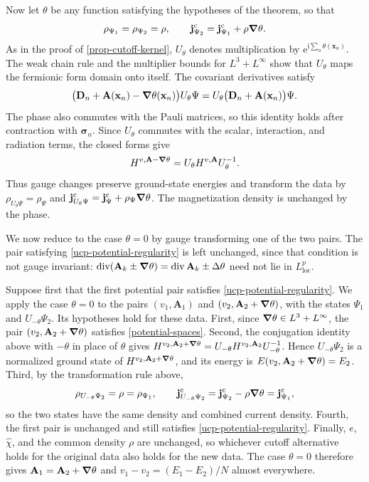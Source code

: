 \documentclass[final,reqno]{amsart}
\DeclareMathOperator{\div}{div}
\theoremstyle{remark}
\renewcommand{\i}{\mathrm{i}}
\newcommand{\e}{\mathrm{e}}
\newcommand{\vjc}{\mathbf{j}^{\mathrm{c}}}
\newcommand{\vsigma}{{\bm{\sigma}}}
\newcommand{\vx}{\mathbf{x}}
\newcommand{\vA}{{\mathbf{A}}}
\newcommand{\vD}{{\mathbf{D}}}
\newcommand{\wh}[1]{\widehat{#1}}
\begin{document}
Now let $\theta$ be any function satisfying the hypotheses of the
theorem, so that
\[
 \rho_{\Psi_1}=\rho_{\Psi_2}=\rho,\qquad
 \vjc_{\Psi_2}=\vjc_{\Psi_1}+\rho\grad\theta.
\]
As in the proof of \cref{prop-cutoff-kernel}, $U_\theta$ denotes
multiplication by $\e^{\i\sum_n\theta(\vx_n)}$.
The weak chain rule and the multiplier bounds for $L^3+L^\infty$
show that $U_\theta$ maps the fermionic form domain onto itself.
The covariant derivatives satisfy
\[
 \bigl(\vD_n+\vA(\vx_n)-\grad\theta(\vx_n)\bigr)U_\theta\Psi
   =U_\theta\bigl(\vD_n+\vA(\vx_n)\bigr)\Psi.
\]
The phase also commutes with the Pauli matrices, so this identity
holds after contraction with $\vsigma_n$.
Since $U_\theta$ commutes with the scalar, interaction, and radiation
terms, the closed forms give
\[
 H^{v,\vA-\grad\theta}
    =U_\theta H^{v,\vA}U_\theta^{-1}.
\]
Thus gauge changes preserve ground-state energies and transform the
data by $\rho_{U_\theta\Psi}=\rho_\Psi$ and
$\vjc_{U_\theta\Psi}=\vjc_\Psi+\rho_\Psi\grad\theta$.
The magnetization density is unchanged by the phase.

We now reduce to the case $\theta=0$ by gauge transforming one of the
two pairs.  The pair satisfying \cref{ucp-potential-regularity} is left
unchanged, since that condition is not gauge invariant:
$\div(\vA_k\pm\grad\theta)=\div\vA_k\pm\Delta\theta$ need not lie in
$L^p_\mathrm{loc}$.

Suppose first that the first potential pair satisfies
\cref{ucp-potential-regularity}.  We apply the case $\theta=0$ to the
pairs $(v_1,\vA_1)$ and $(v_2,\vA_2+\grad\theta)$, with the states
$\Psi_1$ and $U_{-\theta}\Psi_2$.  Its hypotheses hold for these data.
First, since $\grad\theta\in L^3+L^\infty$, the pair
$(v_2,\vA_2+\grad\theta)$ satisfies \cref{potential-spaces}.  Second, the
conjugation identity above with $-\theta$ in place of $\theta$ gives
$H^{v_2,\vA_2+\grad\theta}=U_{-\theta}H^{v_2,\vA_2}U_{-\theta}^{-1}$.  Hence
$U_{-\theta}\Psi_2$ is a normalized ground state of
$H^{v_2,\vA_2+\grad\theta}$, and its energy is
$E(v_2,\vA_2+\grad\theta)=E_2$.  Third, by the transformation rule above,
\[
 \rho_{U_{-\theta}\Psi_2}=\rho=\rho_{\Psi_1},\qquad
 \vjc_{U_{-\theta}\Psi_2}=\vjc_{\Psi_2}-\rho\grad\theta=\vjc_{\Psi_1},
\]
so the two states have the same density and combined current density.
Fourth, the first pair is unchanged and still satisfies
\cref{ucp-potential-regularity}.  Finally, $e$, $\wh\chi$, and the common
density $\rho$ are unchanged, so whichever cutoff alternative holds for
the original data also holds for the new data.  The case $\theta=0$
therefore gives $\vA_1=\vA_2+\grad\theta$ and $v_1-v_2=(E_1-E_2)/N$
almost everywhere.
\end{document}
